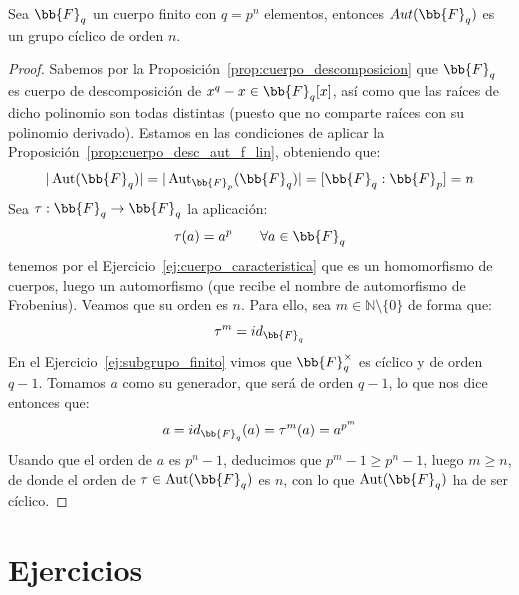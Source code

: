 \begin{teo}
    Sea $\bb{F}_q$ un cuerpo finito con $q=p^n$ elementos, entonces $Aut(\bb{F}_q)$ es un grupo cíclico de orden $n$.
    \begin{proof}
        Sabemos por la Proposición~\ref{prop:cuerpo_descomposicion} que $\bb{F}_q$ es cuerpo de descomposición de $x^q-x\in \bb{F}_q[x]$, así como que las raíces de dicho polinomio son todas distintas (puesto que no comparte raíces con su polinomio derivado). Estamos en las condiciones de aplicar la Proposición~\ref{prop:cuerpo_desc_aut_f_lin}, obteniendo que:
        \begin{equation*}
            |\Aut(\bb{F}_q)| = |\Aut_{\bb{F}_p}(\bb{F}_q)| = [\bb{F}_q : \bb{F}_p] = n
        \end{equation*}
        Sea $\tau:\bb{F}_q\to \bb{F}_q$ la aplicación:
        \begin{equation*}
            \tau(a) = a^{p} \qquad \forall a\in \bb{F}_q
        \end{equation*}
        tenemos por el Ejercicio~\ref{ej:cuerpo_caracteristica} que es un homomorfismo de cuerpos, luego un automorfismo (que recibe el nombre de automorfismo de Frobenius). Veamos que su orden es $n$. Para ello, sea $m\in \mathbb{N}\setminus \{0\}$ de forma que:
        \begin{equation*}
            \tau^m = id_{\bb{F}_q}
        \end{equation*}
        En el Ejercicio~\ref{ej:subgrupo_finito} vimos que $\bb{F}_q^{\times}$ es cíclico y de orden $q-1$. Tomamos $a$ como su generador, que será de orden $q-1$, lo que nos dice entonces que:
        \begin{equation*}
            a = id_{\bb{F}_q}(a) = \tau^m (a)  = a^{p^m}
        \end{equation*}
        Usando que el orden de $a$ es $p^n-1$, deducimos que $p^m -1\geq p^n -1$, luego $m\geq n$, de donde el orden de $\tau\in \Aut(\bb{F}_q)$ es $n$, con lo que $\Aut(\bb{F}_q)$ ha de ser cíclico.
    \end{proof}
\end{teo}


\section{Ejercicios}

